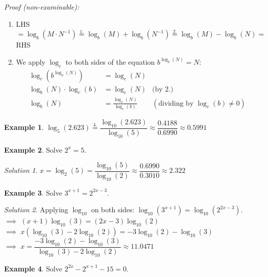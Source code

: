 \documentclass[
  12pt,
  oneside]{book}
\theoremstyle{definition}
\theoremstyle{definition}
\newtheorem{example}{Example}[chapter]
\theoremstyle{definition}
\theoremstyle{definition}
\theoremstyle{remark}
\newtheorem*{solution}{Solution}
\begin{document}
\emph{Proof (non-examinable):}

\begin{enumerate}
\def\labelenumi{\arabic{enumi}.}
\setcounter{enumi}{2}
\item
  LHS \(= \log_b(M\cdot N^{-1}) \stackrel{1.}{=} \log_b(M) + \log_b(N^{-1}) \stackrel{2.}{=} \log_b(M)-\log_b(N) =\) RHS
\item
  We apply \(\log_c\) to both sides of the equation \(b^{\log_b(N)}=N\):
  \begin{align*}
   \log_c\left(b^{\log_b(N)}\right) &= \log_c(N) & \\
   \log_b(N)\cdot \log_c(b) &= \log_c(N) & \text{(by 2.)}\\
   \log_b(N) &= \frac{\log_c(N)}{\log_c(b)} & (\text{dividing by }\log_c(b)\not=0)
  \end{align*}
\end{enumerate}

\begin{example}
\(\log_5(2.623) \stackrel{4.}{=} \dfrac{\log_{10}(2.623)}{\log_{10}(5)} \approx \dfrac{0.4188}{0.6990} \approx 0.5991\)
\end{example}

\begin{example}
Solve \(2^x =5\).
\end{example}

\begin{solution}
\(x=\log_2(5)=\dfrac{\log_{10}(5)}{\log_{10}(2)} \approx\dfrac{0.6990}{0.3010}\approx 2.322\)
\end{solution}

\begin{example}
Solve \(3^{x+1}=2^{2x-3}\).
\end{example}

\begin{solution}
Applying \(\log_{10}\) on both sides: \(\log_{10}(3^{x+1}) = \log_{10}(2^{2x-3})\).\\
\(\implies\) \((x+1)\log_{10}(3) = (2x-3)\log_{10}(2)\)\\
\(\implies\) \(x\left(\log_{10}(3)-2\log_{10}(2)\right) = -3\log_{10}(2)-\log_{10}(3)\)\\
\(\implies\) \(x=\dfrac{-3\log_{10}(2)-\log_{10}(3)}{\log_{10}(3)-2\log_{10}(2)}\approx 11.0471\)
\end{solution}

\begin{example}
Solve \(2^{2x}-2^{x+1}-15=0\).
\end{example}
\end{document}
